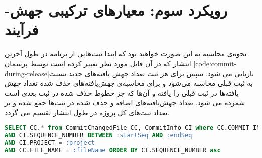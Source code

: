 \section{رویکرد سوم: معیارهای ترکیبی جهش-فرآیند}

نحوه‌ی محاسبه به این صورت خواهید بود که ابتدا ثبت‌هایی از برنامه در طول آخرین انتشار که در آن فایل مورد نظر تغییر کرده است  توسط  پرسمان \ref{code:commit-during-release}بازیابی می شود. سپس برای هر ثبت تعداد جهش یافته‌های جدید نسبت به ثبت قبلی محاسبه می‌شود و برای محاسبه‌ی جهش‌یافته‌های حذف شده تعداد جهش یافته‌ها در  ثبت قبلی را یافته و آن‌ها که جز خطوط حذف شده در ثبت بعدی است شمرده می شود. تعداد جهش‌یافته‌های اضافه و حذف شده در ثبت‌ها جمع شده و بر تعداد ثبت‌های کل پروژه در طول انتشار تقسیم می گردد.



\begin{latin}
\begin{lstlisting}[language=SQL]
SELECT CC.* from CommitChangedFile CC, CommitInfo CI where CC.COMMIT_INFO_ID = CI.ID
AND CI.SEQUENCE_NUMBER BETWEEN :startSeq AND :endSeq
AND CI.PROJECT = :project
AND CC.FILE_NAME = :fileName ORDER BY CI.SEQUENCE_NUMBER asc
\end{lstlisting}
\end{latin}
\label{code:commit-during-release}
